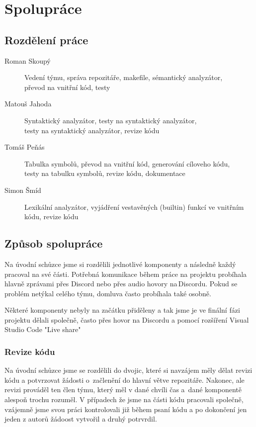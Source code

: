 \documentclass{article}
\begin{document}
    \newpage

    
    \tableofcontents
    \thispagestyle{empty}
    

    \newpage
    
    \section{Spolupráce}
        \subsection{Rozdělení práce}
            \begin{description}
                \item[Roman Skoupý] Vedení týmu, správa repozitáře, makefile, sémantický analyzátor, \\
                převod na vnitřní kód, testy
                \item[Matouš Jahoda] Syntaktický analyzátor, testy na syntaktický analyzátor,\\
                testy na syntaktický analyzátor, revize kódu
                \item[Tomáš Peňás] Tabulka symbolů, převod na vnitřní kód, generování cíloveho kódu, \\
                testy na tabulku symbolů, revize kódu, dokumentace
                \item[Simon Šmíd] Lexikální analyzátor, vyjádření vestavěných (builtin) funkcí ve vnitřním kódu, revize kódu
            \end{description}
            
        \subsection{Způsob spolupráce}
            Na úvodní schůzce jsme si rozdělili jednotlivé komponenty a následně každý pracoval na své části. Potřebná komunikace během práce na projektu probíhala hlavně zprávami přes Discord nebo přes audio hovory na\,Discordu. Pokud se problém netýkal celého týmu, domluva často probíhala také osobně.

            Některé komponenty nebyly na začátku přiděleny a tak jsme je ve finální fázi projektu dělali společně, často přes hovor na Discordu a pomocí rozšíření Visual Studio Code "Live share"
            
            \subsubsection{Revize kódu}
                Na úvodní schůzce jsme se rozdělili do dvojic, které si navzájem měly dělat revizi kódu a potvrzovat žádosti o~začlenění do hlavní větve repozitáře. Nakonec, ale revizi prováděl ten člen týmu, který měl v dané chvíli čas a~dané komponentě alespoň trochu rozuměl. V případech že jsme na části kódu pracovali společně, vzájemně jsme svou práci kontrolovali již během psaní kódu a po dokončení jen jeden z autorů žádoost vytvořil a druhý potrvrdil.
\end{document}
